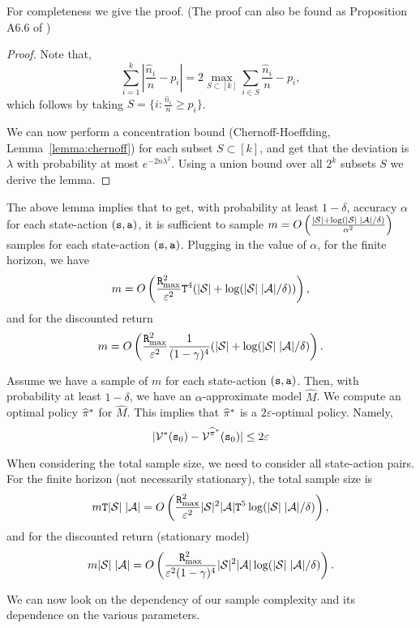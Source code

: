 For completeness we give the proof. (The proof can also be found as
Proposition A6.6 of %
\cite{van1996weak})
\begin{proof}
Note that,
\[
\sum_{i=1}^k |\frac{\hat{n}_i}{n}-p_i| = 2\max_{S\subset [k]}
\sum_{i\in S} \frac{\hat{n}_i}{n}-p_i,
\]
which follows by taking $S=\{i:\frac{\hat{n}_i}{n}\geq p_i\}$.

We can now perform a concentration bound (Chernoff-Hoeffding, Lemma~\ref{lemma:chernoff}) for
each subset $S\subset [k]$, and get that the deviation is $\lambda$
with probability at most $e^{-2n\lambda^2}$. Using a union bound
over all $2^k$ subsets $S$ we
 derive the lemma.
\end{proof}

The above lemma implies that to get, with probability at least $1-\delta$,
accuracy $\alpha$ for each state-action $({\tt s},{\tt a})$, it is sufficient to
sample $m=O\left(\frac{|\mathcal{S}| +
\log(|\mathcal{S}|\;|\mathcal{A}|/\delta)}{\alpha^2} \right)$ samples for each
state-action  $({\tt s},{\tt a})$. Plugging in the value of
$\alpha$, for the finite horizon, we have
\[
m=O\left(\frac{{\tt R}_{\max }^2}{\varepsilon^2} {\tt T}^4 (|\mathcal{S}|+\log
(|\mathcal{S}|\;|\mathcal{A}|/\delta))\right),
\]
and for the discounted return
\[
m=O\left(\frac{{\tt R}_{\max }^2}{\varepsilon^2}  \frac{1}{(1-\gamma)^4}
(|\mathcal{S}|+\log (|\mathcal{S}|\;|\mathcal{A}|/\delta)\right).
\]


Assume we have a sample of $m$ for each state-action $({\tt s},{\tt a})$. Then,
with probability at least $1-\delta$, we have an $\alpha$-approximate model
$\widehat{M}$.
%
We compute an optimal policy $\widehat{\pi}^*$ for
$\widehat{M}$.
%
This implies that $\widehat{\pi}^*$ is a $2\varepsilon$-optimal
policy. Namely,
\[
|\mathcal{V}^*({\tt s}_0)-\mathcal{V}^{\widehat{\pi}^*}({\tt s}_0)|\leq
2\varepsilon
\]


When considering the total sample size, we need to consider all
state-action pairs. For the finite horizon (not necessarily stationary), the total sample size is
\[
m{\tt T}|\mathcal{S}|\;|\mathcal{A}|=O\left(\frac{{\tt R}_{\max }^2}{\varepsilon^2}
|\mathcal{S}|^2 |\mathcal{A}| {\tt T}^5 \log
(|\mathcal{S}|\;|\mathcal{A}|/\delta)\right),
\]
and for the discounted return (stationary model)
\[
m|\mathcal{S}|\;|\mathcal{A}|=O\left(\frac{{\tt R}_{\max }^2}{\varepsilon^2(1-\gamma)^4} |\mathcal{S}|^2 |\mathcal{A}|  \log(|\mathcal{S}|\;|\mathcal{A}|/\delta)\right).
\]

We can now look on the dependency of our sample complexity and its
dependence on the various parameters.

